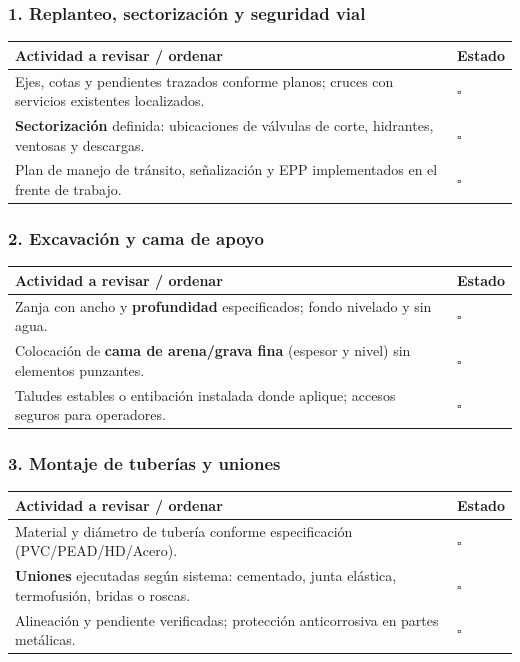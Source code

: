 \documentclass[12pt]{article}
\newcommand{\cbox}{\(\square\)} %
\begin{document}
	\subsubsection*{1. Replanteo, sectorización y seguridad vial}
	\begin{tabularx}{\linewidth}{>{\raggedright\arraybackslash}p{0.93\linewidth} >{\centering\arraybackslash}m{0.07\linewidth}}
		\toprule
		\textbf{Actividad a revisar / ordenar} & \textbf{Estado}\\
		\midrule
		Ejes, cotas y pendientes trazados conforme planos; cruces con servicios existentes localizados. & \cbox \\
		\textbf{Sectorización} definida: ubicaciones de válvulas de corte, hidrantes, ventosas y descargas. & \cbox \\
		Plan de manejo de tránsito, señalización y EPP implementados en el frente de trabajo. & \cbox \\
		\bottomrule
	\end{tabularx}
	
	\subsubsection*{2. Excavación y cama de apoyo}
	\begin{tabularx}{\linewidth}{>{\raggedright\arraybackslash}p{0.93\linewidth} >{\centering\arraybackslash}m{0.07\linewidth}}
		\toprule
		\textbf{Actividad a revisar / ordenar} & \textbf{Estado}\\
		\midrule
		Zanja con ancho y \textbf{profundidad} especificados; fondo nivelado y sin agua. & \cbox \\
		Colocación de \textbf{cama de arena/grava fina} (espesor y nivel) sin elementos punzantes. & \cbox \\
		Taludes estables o entibación instalada donde aplique; accesos seguros para operadores. & \cbox \\
		\bottomrule
	\end{tabularx}
	
	\subsubsection*{3. Montaje de tuberías y uniones}
	\begin{tabularx}{\linewidth}{>{\raggedright\arraybackslash}p{0.93\linewidth} >{\centering\arraybackslash}m{0.07\linewidth}}
		\toprule
		\textbf{Actividad a revisar / ordenar} & \textbf{Estado}\\
		\midrule
		Material y diámetro de tubería conforme especificación (PVC/PEAD/HD/Acero). & \cbox \\
		\textbf{Uniones} ejecutadas según sistema: cementado, junta elástica, termofusión, bridas o roscas. & \cbox \\
		Alineación y pendiente verificadas; protección anticorrosiva en partes metálicas. & \cbox \\
		\bottomrule
	\end{tabularx}
	
\end{document}

